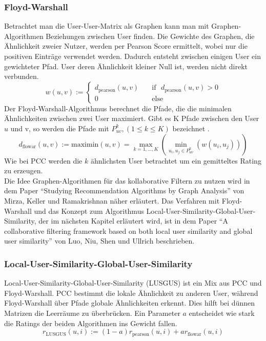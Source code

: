 \subsubsection{Floyd-Warshall}\label{s.flowar}
Betrachtet man die User-User-Matrix als Graphen kann man mit Graphen-Algorithmen Beziehungen zwischen User finden. Die Gewichte des Graphen, die Ähnlichkeit zweier Nutzer, werden per Pearson Score ermittelt, wobei nur die positiven Einträge verwendet werden. Dadurch entsteht zwischen einigen User ein gewichteter Pfad. User deren Ähnlichkeit kleiner Null ist, werden nicht direkt verbunden.
	\begin{equation}
	w(u,v) :=\left\{ \begin{array}{ll} d_{\mathrm{pearson}}(u,v) & \quad \mathrm{if}\textbf{ } d_{\mathrm{pearson}}(u,v)>0 \\  0 & \quad \mathrm{else}\end{array}\right.	\label{weights}
	\end{equation}
Der Floyd-Warshall-Algorithmus berechnet die Pfade, die die minimalen Ähnlichkeiten zwischen zwei User maximiert. Gibt es K Pfade zwischen den User $u$ und v, so werden die Pfade mit $P^{k}_{uv}, (1\leq k\leq K)$ bezeichnet \cite{cf}.
	\begin{equation}
	d_{\mathrm{flowar}}(u,v) := \mathrm{maximin}(u,v) = \max\limits_{k=1,...,K} (\min\limits_{u_{i},u_{j}\in P^{k}_{uv}} (w(u_{i},u_{j}))) 	\label{maximin}
	\end{equation}
Wie bei PCC werden die $k$ ähnlichsten User betrachtet um ein gemitteltes Rating zu erzeugen.\\
Die Idee Graphen-Algorithmen für das kollaborative Filtern zu nutzen wird in dem Paper "`Studying Recommendation Algorithms by Graph Analysis"'\cite{graph} von Mirza, Keller und Ramakrishnan näher erläutert. Das Verfahren mit Floyd-Warshall und das Konzept zum Algorithmus Local-User-Similarity-Global-User-Similarity, der im nächsten Kapitel erläutert wird, ist in dem Paper "`A collaborative filtering framework based on both local user similarity and global user similarity"'\cite{cf} von Luo, Niu, Shen und Ullrich beschrieben.


\subsubsection{Local-User-Similarity-Global-User-Similarity}\label{s.lusgus}
Local-User-Similarity-Global-User-Similarity (LUSGUS) ist ein Mix aus PCC und Floyd-Warshall. PCC bestimmt die lokale Ähnlichkeit zu anderen User, während Floyd-Warshall über Pfade globale Ähnlichkeiten erkennt. Dies hilft bei dünnen Matrizen die Leerräume zu überbrücken.
Ein Parameter $a$ entscheidet wie stark die Ratings der beiden Algorithmen ins Gewicht fallen.
	\begin{equation}
	r_{\mathrm{LUSGUS}}(u,i) := (1-a)r_{\mathrm{pearson}}(u,i) + a r_{\mathrm{flowar}}(u,i)  	\label{LUSGUS}
	\end{equation}


